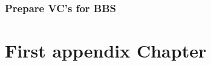 \documentclass[
	a4paper               %
	,bibliography=totoc   %
	,listof=totoc         %
	,monolingual
]{bfhthesis}              %
\begin{document}
\subsection{Prepare VC's for BBS}





\appendix

\chapter{First appendix Chapter}





\end{document}
